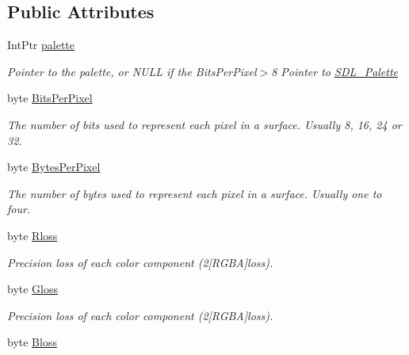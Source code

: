 \subsection*{Public Attributes}
\begin{DoxyCompactItemize}
\item 
IntPtr \hyperlink{struct_s_d_l___pixel_format_a5578b72f8e6c6b8f4feb8e9d67d7af04}{palette}
\begin{DoxyCompactList}\small\item\em Pointer to the palette, or NULL if the BitsPerPixel$>$8 Pointer to \hyperlink{struct_s_d_l___palette}{SDL\_\-Palette} \item\end{DoxyCompactList}\item 
byte \hyperlink{struct_s_d_l___pixel_format_a28aabdce8eba3259ddea6b43a8703387}{BitsPerPixel}
\begin{DoxyCompactList}\small\item\em The number of bits used to represent each pixel in a surface. Usually 8, 16, 24 or 32. \item\end{DoxyCompactList}\item 
byte \hyperlink{struct_s_d_l___pixel_format_ad504a9f390e02c8e508419d1a85202f8}{BytesPerPixel}
\begin{DoxyCompactList}\small\item\em The number of bytes used to represent each pixel in a surface. Usually one to four. \item\end{DoxyCompactList}\item 
byte \hyperlink{struct_s_d_l___pixel_format_a1e19f6685404bb72ce971d1f7483c8af}{Rloss}
\begin{DoxyCompactList}\small\item\em Precision loss of each color component (2\mbox{[}RGBA\mbox{]}loss). \item\end{DoxyCompactList}\item 
byte \hyperlink{struct_s_d_l___pixel_format_aa54c85bb3f6868c7c66e7dc58ad6be26}{Gloss}
\begin{DoxyCompactList}\small\item\em Precision loss of each color component (2\mbox{[}RGBA\mbox{]}loss). \item\end{DoxyCompactList}\item 
byte \hyperlink{struct_s_d_l___pixel_format_a8fc149bdf59ec68f4d7c1e11a1bf36d7}{Bloss}

\end{DoxyCompactItemize}
